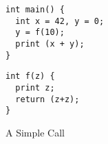 \begin{figure}[b]
    \begin{minipage}{.3\textwidth}
\begin{verbatim}
int main() {
  int x = 42, y = 0;
  y = f(10);
  print (x + y);
}
\end{verbatim}
    \end{minipage}
    \begin{minipage}{.3\textwidth}
\begin{verbatim}
int f(z) {
  print z;
  return (z+z);
}
\end{verbatim}
    \end{minipage}
\caption{A Simple Call}
\label{fig:simple-program}
\end{figure}


\newcommand*{\add}{\textsc{add}}
\newcommand*{\addi}{\textsc{addi}}
\newcommand*{\sw}{\textsc{sw}}
\newcommand*{\lw}{\textsc{lw}}
\newcommand*{\jal}{\textsc{jal}}
\newcommand*{\jalr}{\textsc{jalr}}
\newcommand*{\rra}{\textsc{ra}}
\newcommand*{\rout}{\textsc{out}}

\newcommand*{\tagInstr}{\textsc{instr}}
\newcommand*{\tagCall}{\textsc{call}}
\newcommand*{\tagHa}{\textsc{h1}}
\newcommand*{\tagHb}{\textsc{h2}}
\newcommand*{\tagRa}{\textsc{r1}}
\newcommand*{\tagRb}{\textsc{r2}}
\newcommand*{\tagRc}{\textsc{r3}}
\newcommand*{\tagNoDepth}{\textsc{unused}}
\newcommand*{\tagStackDepth}[1]{\textsc{stack} ~ #1}
\newcommand*{\tagPCDepth}[1]{\textsc{pc} ~ #1}
\newcommand*{\tagSP}{\textsc{sp}}

\setcounter{pcctr}{0}
\newcommand*{\row}[4]{
  \thepcctr & \stepcounter{pcctr} #2 & #3 & \text{#4}\\
}
\newcommand*{\tracerow}[5]{
  #1 & #2 & #3 & #4 & \text{#5}\\
}
\newcommand*{\summary}[6]{
\[
\begin{array}{cccccc}
  \PCname = #1 & r_0 = #2 & \rra = #3 & \rsp = #4 & r_4 = #5 & r_5 = #6
\end{array}
\]
}
\newcommand{\negate}{\textrm{-}}


\newcommand{\instrc}{lgray}
\newcommand{\mainsealc}{cyan}
\newcommand{\fsealc}{green}
\newcommand{\unsealc}{gray}
\newcommand{\emptyoutc}{white} %
\newcommand{\fulloutc}{white}

